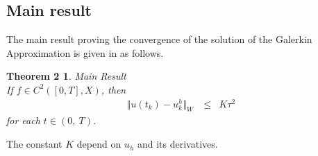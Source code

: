 \documentclass[../../main.tex]{subfiles}
\begin{document}
\subsection{Main result}
The main result proving the convergence of the solution of the Galerkin
Approximation is given in \cite{BV13} as follows.
\newtheorem*{DC_Thm5}{Theorem 2}
\begin{DC_Thm5}
	{Main Result}\\
	If $f\in C^{2}([0,T],X)$, then
	\begin{eqnarray*}
		\Vert u(t_{k})-u_{k}^{h}\Vert_{W}\ & \leq & K\tau^2
	\end{eqnarray*}
	for each $t\in(0,\ T)$.
\end{DC_Thm5}

The constant $K$ depend on $u_h$ and its derivatives.
\end{document}
